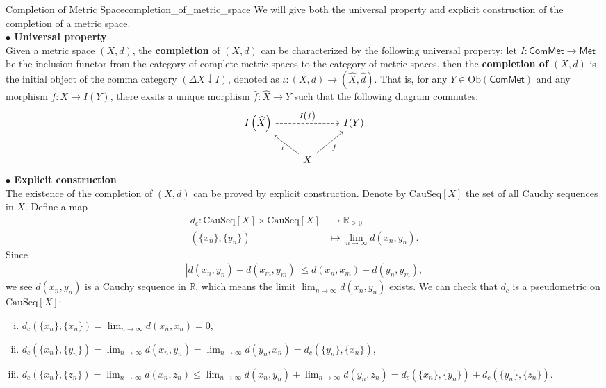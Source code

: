 \documentclass{report}
\begin{document}
\begin{definition}{Completion of Metric Space}{completion_of_metric_space}
	We will give both the universal property and explicit construction of the completion of a metric space.\\
	\textbf{$\bullet$ Universal property}\\
	Given a metric space $(X,d)$, the \textbf{completion} of $(X,d)$ can be characterized by the following universal property: let $I: \mathsf{ComMet}\to\mathsf{Met}$ be the inclusion functor from the category of complete metric spaces to the category of metric spaces, then the \textbf{completion of $(X,d)$} is the initial object of the comma category $\left(\Delta X\downarrow I\right)$, denoted as $\iota:(X,d)\to\left(\widehat{X},\hat{d}\right)$. That is, for any $Y\in\mathrm{Ob}(\mathsf{ComMet})$ and any morphism $f:X\to I(Y)$, there exsits a unique morphism $\hat{f}:\widehat{X}\to Y$ such that the following diagram commutes:
	\[
		\begin{tikzcd}
			I\left(\widehat{X}\right) \arrow[rr, "I\left(\hat{f}\right)", dashed] &                                        & I(Y) \\
			& X \arrow[lu, "\iota"] \arrow[ru, "f"'] &
		\end{tikzcd}
	\]
	\textbf{$\bullet$ Explicit construction}\\
	The existence of the completion of $(X,d)$ can be proved by explicit construction. Denote by $\mathrm{CauSeq}[X]$ the set of all Cauchy sequences in $X$. Define a map
	\begin{align*}
		d_c:\mathrm{CauSeq}[X]\times\mathrm{CauSeq}[X] & \longrightarrow\mathbb{R}_{\ge 0}       \\
		\left(\{x_n\},\{y_n\}\right)                   & \longmapsto\lim_{n\to\infty}d(x_n,y_n).
	\end{align*}
	Since
	\begin{align*}
		|d(x_n,y_n)-d(x_m,y_m)|\le d(x_n,x_m)+d(y_n,y_m),
	\end{align*}
	we see $d(x_n,y_n)$ is a Cauchy sequence in $\mathbb{R}$, which means the limit $\lim_{n\to\infty}d(x_n,y_n)$ exists. We can check that $d_c$ is a pseudometric on $\mathrm{CauSeq}[X]$:
	\begin{enumerate}[(i)]
		\item $d_c(\{x_n\},\{x_n\})=\lim_{n\to\infty}d(x_n,x_n)=0$,
		\item $d_c(\{x_n\},\{y_n\})=\lim_{n\to\infty}d(x_n,y_n)=\lim_{n\to\infty}d(y_n,x_n)=d_c(\{y_n\},\{x_n\})$,
		\item $d_c(\{x_n\},\{z_n\})=\lim_{n\to\infty}d(x_n,z_n)\le\lim_{n\to\infty}d(x_n,y_n)+\lim_{n\to\infty}d(y_n,z_n)=d_c(\{x_n\},\{y_n\})+d_c(\{y_n\},\{z_n\})$.

\end{enumerate}
\end{definition}
\end{document}

